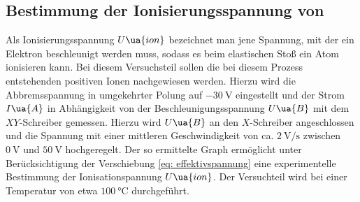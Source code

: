 \subsection{Bestimmung der Ionisierungsspannung von }
Als Ionisierungsspannung $U\ua{ion}$ bezeichnet man jene Spannung, mit der ein Elektron beschleunigt werden
muss, sodass es beim elastischen Stoß ein Atom ionisieren kann. Bei diesem Versuchsteil sollen die bei diesem
Prozess entstehenden positiven Ionen nachgewiesen werden. Hierzu wird die Abbremsspannung in umgekehrter Polung
auf $\SI{-30}{\volt}$ eingestellt und der Strom $I\ua{A}$ in Abhängigkeit von der Beschleunigungsspannung $U\ua{B}$
mit dem $XY$-Schreiber gemessen. Hierzu wird $U\ua{B}$ an den $X$-Schreiber angeschlossen und die Spannung mit einer
mittleren Geschwindigkeit von ca. $\SI{2}{\volt \per\second}$ zwischen $\SI{0}{\volt}$ und $\SI{50}{\volt}$ hochgeregelt.
Der so ermittelte Graph ermöglicht unter Berücksichtigung der Verschiebung \ref{eq: effektivspannung} eine
experimentelle Bestimmung der Ionisationspannung $U\ua{ion}$. Der Versuchteil wird bei einer Temperatur von etwa $\SI{100}{\celsius}$
durchgeführt.
